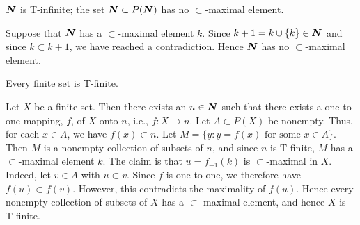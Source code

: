  $\boldsymbol{N}$ is T-infinite; the set $\boldsymbol{N} \subset P(\boldsymbol{N})$ has no 
$\subset$-maximal element.
\begin{solution}
  Suppose that $\boldsymbol{N}$ has a $\subset$-maximal element $k$. Since 
  $k + 1 = k \cup \{ k \} \in \boldsymbol{N}$ and since $k \subset k + 1$, we have reached a 
  contradiction. Hence $\boldsymbol{N}$ has no $\subset$-maximal element.
\end{solution}

 Every finite set is T-finite.
\begin{solution}
  Let $X$ be a finite set. Then there exists an $n \in \boldsymbol{N}$ such that there 
  exists a one-to-one mapping, $f$, of $X$ onto $n$, i.e., 
  $f : X \rightarrow n$. Let $A \subset P(X)$ be nonempty. Thus, for each 
  $x \in A$, we have $f(x) \subset n$. Let 
  $M = \{ y : y = f(x) \text{ for some } x \in A \}$. Then $M$ is a nonempty 
  collection of subsets of $n$, and since $n$ is T-finite, $M$ has a 
  $\subset$-maximal element $k$. The claim is that $u = f_{-1}(k)$ is 
  $\subset$-maximal in $X$. Indeed, let $v \in A$ with $u \subset v$. Since 
  $f$ is one-to-one, we therefore have $f(u) \subset f(v)$. However, this 
  contradicts the maximality of $f(u)$. Hence every nonempty collection of 
  subsets of $X$ has a $\subset$-maximal element, and hence $X$ is T-finite.
\end{solution}